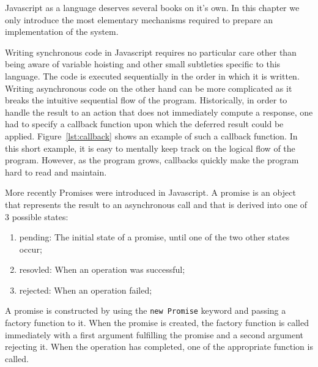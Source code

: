 Javascript as a language deserves several books on it's own. In this chapter we only introduce the most elementary mechanisms required to prepare an implementation of the system.

Writing synchronous code in Javascript requires no particular care other than being aware of variable hoisting and other small subtleties specific to this language. The code is executed sequentially in the order in which it is written. Writing asynchronous code on the other hand can be more complicated as it breaks the intuitive sequential flow of the program. Historically, in order to handle the result to an action that does not immediately compute a response, one had to specify a callback function upon which the deferred result could be applied. Figure~\ref{lst:callback} shows an example of such a callback function. In this short example, it is easy to mentally keep track on the logical flow of the program. However, as the program grows, callbacks quickly make the program hard to read and maintain.



More recently Promises were introduced in Javascript. A promise is an object that represents the result to an asynchronous call and that is derived into one of 3 possible states:
\begin{enumerate}
    \item pending: The initial state of a promise, until one of the two other states occur;
    \item resovled: When an operation was successful;
    \item rejected: When an operation failed;
\end{enumerate}

A promise is constructed by using the \lstinline{new Promise} keyword and passing a factory function to it. When the promise is created, the factory function is called immediately with a first argument fulfilling the promise and a second argument rejecting it. When the operation has completed, one of the appropriate function is called.

